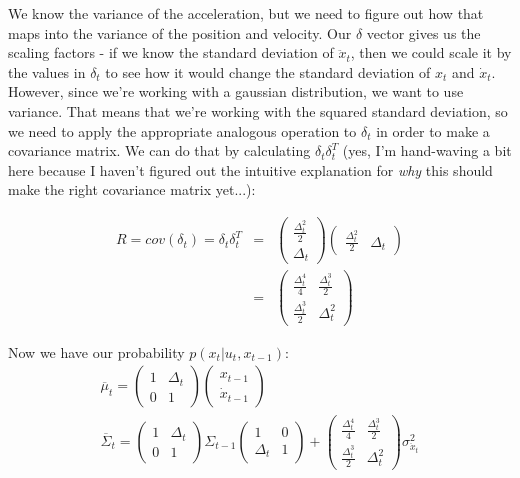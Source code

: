 \documentclass[10pt]{article}
\begin{document}
\begin{enumerate}
\begin{enumerate}
  We know the variance of the acceleration, but we need to figure out how that
  maps into the variance of the position and velocity. Our $\delta$ vector gives
  us the scaling factors - if we know the standard deviation of $\ddot{x}_t$,
  then we could scale it by the values in $\delta_t$ to see how it would change
  the standard deviation of $x_t$ and $\dot{x}_t$. However, since we're working
  with a gaussian distribution, we want to use variance. That means that we're
  working with the squared standard deviation, so we need to apply the
  appropriate analogous operation to $\delta_t$ in order to make a covariance
  matrix. We can do that by calculating $\delta_t \delta_t^T$ (yes, I'm
  hand-waving a bit here because I haven't figured out the intuitive explanation
  for \textit{why} this should make the right covariance matrix yet...):

  \begin{align}
    R = cov\left(\delta_t\right) = \delta_t \delta_t^T &=& 
  \begin{pmatrix}\frac{\Delta_t^2}{2} \\ \Delta_t\end{pmatrix} 
  \begin{pmatrix}\frac{\Delta_t^2}{2} & \Delta_t\end{pmatrix} \\
                                      &=&
  \begin{pmatrix}\frac{\Delta_t^4}{4} & \frac{\Delta_t^3}{2} \\
    \frac{\Delta_t^3}{2} & \Delta_t^2 \end{pmatrix}
  \end{align}

  Now we have our probability $p(x_t | u_t,x_{t-1})$:
  \begin{gather}
  \overline{\mu}_t = \begin{pmatrix}1 & \Delta_t \\ 0 & 1\end{pmatrix}
  \begin{pmatrix}x_{t-1} \\ \dot{x}_{t-1}\end{pmatrix}\\
  \overline{\Sigma}_t = \begin{pmatrix}1 & \Delta_t \\ 0 & 1\end{pmatrix}
    \Sigma_{t-1}
  \begin{pmatrix}1 & 0 \\ \Delta_t & 1\end{pmatrix} + 
  \begin{pmatrix}\frac{\Delta_t^4}{4} & \frac{\Delta_t^3}{2} \\
  \frac{\Delta_t^3}{2} & \Delta_t^2 \end{pmatrix} \sigma_{\ddot{x}_t}^2
 \end{gather}


\end{enumerate}
\end{enumerate}
\end{document}
